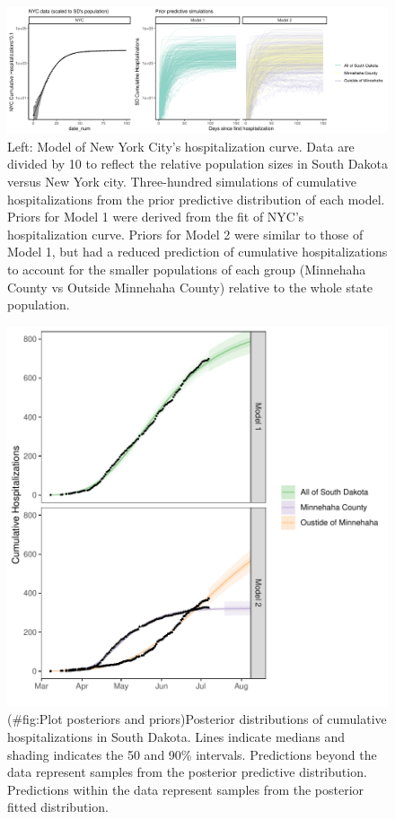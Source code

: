\documentclass[
]{article}
\begin{document}
\begin{figure}
\centering
\includegraphics{test_files/figure-latex/plot-nyc-1.pdf}
\caption{\label{fig:plot-nyc}Left: Model of New York City's hospitalization curve. Data are divided by 10 to reflect the relative population sizes in South Dakota versus New York city. Three-hundred simulations of cumulative hospitalizations from the prior predictive distribution of each model. Priors for Model 1 were derived from the fit of NYC's hospitalization curve. Priors for Model 2 were similar to those of Model 1, but had a reduced prediction of cumulative hospitalizations to account for the smaller populations of each group (Minnehaha County vs Outside Minnehaha County) relative to the whole state population.\label{prior:plot}}
\end{figure}

\begin{figure}
\centering
\includegraphics{test_files/figure-latex/Plot posteriors and priors-1.pdf}
\caption{(\#fig:Plot posteriors and priors)Posterior distributions of cumulative hospitalizations in South Dakota. Lines indicate medians and shading indicates the 50 and 90\% intervals. Predictions beyond the data represent samples from the posterior predictive distribution. Predictions within the data represent samples from the posterior fitted distribution.\label{post_all:plot}}
\end{figure}
\end{document}
